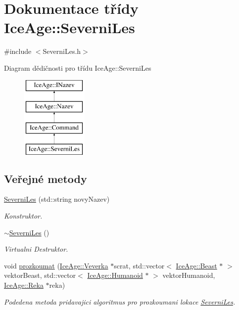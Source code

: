 \hypertarget{classIceAge_1_1SeverniLes}{}\section{Dokumentace třídy Ice\+Age\+:\+:Severni\+Les}
\label{classIceAge_1_1SeverniLes}


{\ttfamily \#include $<$Severni\+Les.\+h$>$}

Diagram dědičnosti pro třídu Ice\+Age\+:\+:Severni\+Les\begin{figure}[H]
\begin{center}
\leavevmode
\includegraphics[height=4.000000cm]{dd/d57/classIceAge_1_1SeverniLes}
\end{center}
\end{figure}
\subsection*{Veřejné metody}
\begin{DoxyCompactItemize}
\item 
\hyperlink{classIceAge_1_1SeverniLes_accad5e1d48610aabeef941f2ba182832}{Severni\+Les} (std\+::string novy\+Nazev)
\begin{DoxyCompactList}\small\item\em Konstruktor. \end{DoxyCompactList}\item 
\hyperlink{classIceAge_1_1SeverniLes_abfc44ad357a1eeb29a0aead797dfe6b8}{$\sim$\+Severni\+Les} ()
\begin{DoxyCompactList}\small\item\em Virtualni Destruktor. \end{DoxyCompactList}\item 
void \hyperlink{classIceAge_1_1SeverniLes_a59fd82f865c7b89988752f16b0e10322}{prozkoumat} (\hyperlink{classIceAge_1_1Veverka}{Ice\+Age\+::\+Veverka} $\ast$scrat, std\+::vector$<$ \hyperlink{classIceAge_1_1Beast}{Ice\+Age\+::\+Beast} $\ast$ $>$ vektor\+Beast, std\+::vector$<$ \hyperlink{classIceAge_1_1Humanoid}{Ice\+Age\+::\+Humanoid} $\ast$ $>$ vektor\+Humanoid, \hyperlink{classIceAge_1_1Reka}{Ice\+Age\+::\+Reka} $\ast$reka)
\begin{DoxyCompactList}\small\item\em Podedena metoda pridavajici algoritmus pro prozkoumani lokace \hyperlink{classIceAge_1_1SeverniLes}{Severni\+Les}. \end{DoxyCompactList}\end{DoxyCompactItemize}
